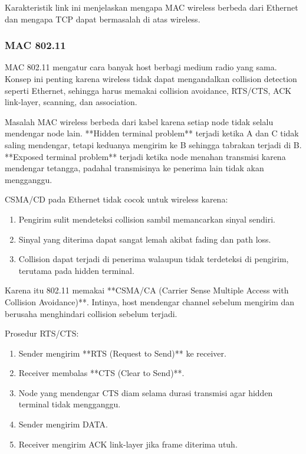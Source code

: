 Karakteristik link ini menjelaskan mengapa MAC wireless berbeda dari Ethernet dan mengapa TCP dapat bermasalah di atas wireless.

\subsubsection{MAC 802.11}
\begin{jawab}
MAC 802.11 mengatur cara banyak host berbagi medium radio yang sama. Konsep ini penting karena wireless tidak dapat mengandalkan collision detection seperti Ethernet, sehingga harus memakai collision avoidance, RTS/CTS, ACK link-layer, scanning, dan association.
\end{jawab}

Masalah MAC wireless berbeda dari kabel karena setiap node tidak selalu mendengar node lain. **Hidden terminal problem** terjadi ketika A dan C tidak saling mendengar, tetapi keduanya mengirim ke B sehingga tabrakan terjadi di B. **Exposed terminal problem** terjadi ketika node menahan transmisi karena mendengar tetangga, padahal transmisinya ke penerima lain tidak akan mengganggu.

CSMA/CD pada Ethernet tidak cocok untuk wireless karena:
\begin{enumerate}
    \item Pengirim sulit mendeteksi collision sambil memancarkan sinyal sendiri.
    \item Sinyal yang diterima dapat sangat lemah akibat fading dan path loss.
    \item Collision dapat terjadi di penerima walaupun tidak terdeteksi di pengirim, terutama pada hidden terminal.
\end{enumerate}

Karena itu 802.11 memakai **CSMA/CA (Carrier Sense Multiple Access with Collision Avoidance)**. Intinya, host mendengar channel sebelum mengirim dan berusaha menghindari collision sebelum terjadi.

Prosedur RTS/CTS:
\begin{enumerate}
    \item Sender mengirim **RTS (Request to Send)** ke receiver.
    \item Receiver membalas **CTS (Clear to Send)**.
    \item Node yang mendengar CTS diam selama durasi transmisi agar hidden terminal tidak mengganggu.
    \item Sender mengirim DATA.
    \item Receiver mengirim ACK link-layer jika frame diterima utuh.
\end{enumerate}

